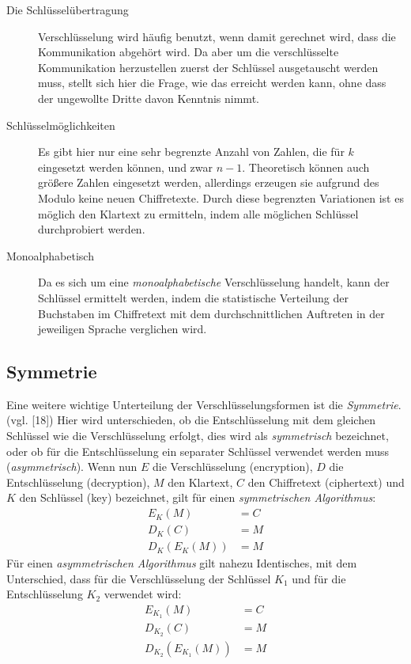 \documentclass{scrarticle}
\begin{document}
    \begin{description}
        \item[Die Schlüsselübertragung] Verschlüsselung wird häufig benutzt, wenn damit gerechnet wird, dass die Kommunikation abgehört wird. Da aber um die verschlüsselte Kommunikation herzustellen zuerst der Schlüssel ausgetauscht werden muss, stellt sich hier die Frage, wie das erreicht werden kann, ohne dass der ungewollte Dritte davon Kenntnis nimmt.
        \item[Schlüsselmöglichkeiten] Es gibt hier nur eine sehr begrenzte Anzahl von Zahlen, die für $k$ eingesetzt werden können, und zwar $n-1$. Theoretisch können auch größere Zahlen eingesetzt werden, allerdings erzeugen sie aufgrund des Modulo keine neuen Chiffretexte. Durch diese begrenzten Variationen ist es möglich den Klartext zu ermitteln, indem alle möglichen Schlüssel durchprobiert werden.
        \item[Monoalphabetisch] Da es sich um eine \emph{monoalphabetische} Verschlüsselung handelt, kann der Schlüssel ermittelt werden, indem die statistische Verteilung der Buchstaben im Chiffretext mit dem durchschnittlichen Auftreten in der jeweiligen Sprache verglichen wird.
    \end{description}

    \subsection{Symmetrie}
        Eine weitere wichtige Unterteilung der Verschlüsselungsformen ist die \emph{Symmetrie}. (vgl. \cite{ertel2003}[18]) Hier wird unterschieden, ob die Entschlüsselung mit dem gleichen Schlüssel wie die Verschlüsselung erfolgt, dies wird als \emph{symmetrisch} bezeichnet, oder ob für die Entschlüsselung ein separater Schlüssel verwendet werden muss (\emph{asymmetrisch}). Wenn nun $E$ die Verschlüsselung (encryption), $D$ die Entschlüsselung (decryption), $M$ den Klartext, $C$ den Chiffretext (ciphertext) und $K$ den Schlüssel (key) bezeichnet, gilt für einen \emph{symmetrischen Algorithmus}:
        \begin{align}
            E_K(M) &= C\\
            D_K(C) &= M\\
            D_K\left(E_K(M)\right) &= M
        \end{align}
        Für einen \emph{asymmetrischen Algorithmus} gilt nahezu Identisches, mit dem Unterschied, dass für die Verschlüsselung der Schlüssel $K_1$ und für die Entschlüsselung $K_2$ verwendet wird:
        \begin{align}
            E_{K_1}(M) &= C \label{eq:funf} \\
            D_{K_2}(C) &= M \label{eq:sechs}    \\
            D_{K_2}\left(E_{K_1}(M)\right) &= M     \label{eq:sieben}
        \end{align}
\end{document}
